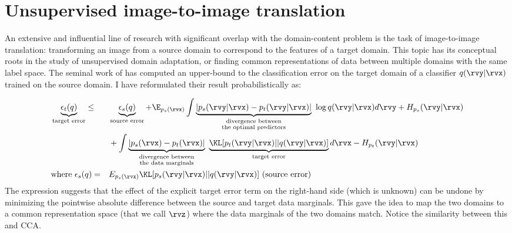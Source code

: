 \documentclass[withindex,glossary,firstyr,times]{cam-thesis}
\begin{document}
\section{Unsupervised image-to-image translation}

An extensive and influential line of research with significant overlap with the domain-content problem is the task of image-to-image translation: transforming an image from a source domain to correspond to the features of a target domain. This topic has its conceptual roots in the study of unsupervised domain adaptation, or finding common representations of data between multiple domains with the same label space. The seminal work of \citet{ben2010theory} has computed an upper-bound to the classification error on the target domain of a classifier $q(\rvy | \rvx)$ trained on the source domain. I have reformulated their result probabilistically as:

\begin{alignat}{2}
    &\underbrace{\epsilon_t(q)}_{\text{target error}} \leq ~ &&\underbrace{\epsilon_s(q)}_{\text{source error}} + \E_{p_s(\rvx)} \int \underbrace{|p_s(\rvy | \rvx) - p_t(\rvy | \rvx)|}_{\substack{\text{divergence between} \\ \text{the optimal predictors}}} ~ \log q(\rvy | \rvx) d\rvy + H_{p_s} (\rvy | \rvx) \notag\\ & &&+ \int \underbrace{|p_s(\rvx) - p_t(\rvx)|}_{\substack{\text{divergence between} \\ \text{the data marginals}}} ~ \underbrace{\KL[p_t(\rvy | \rvx) || q(\rvy | \rvx)]}_{\text{target error}} d\rvx - H_{p_t} (\rvy | \rvx) \\
    &\text{where} ~ \epsilon_s(q) = && E_{p_s(\rvx)} \KL [p_s(\rvy | \rvx) || q(\rvy | \rvx)] ~ \text{(source error)}
\end{alignat}
The expression suggests that the effect of the explicit target error term on the right-hand side (which is unknown) can be undone by minimizing the pointwise absolute difference between the source and target data marginals. This gave \citet{ben2010theory} the idea to map the two domains to a common representation space (that we call $\rvz$) where the data marginals of the two domains match. Notice the similarity between this and CCA.
\end{document}
